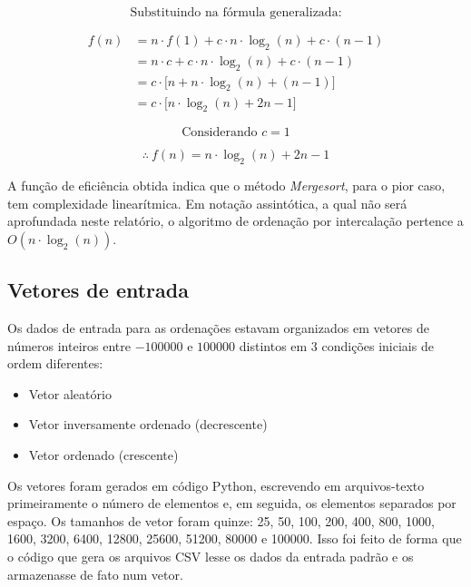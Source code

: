 \documentclass[fontsize=10pt]{article}
\begin{document}
$$ \text{Substituindo na fórmula generalizada:}$$

\begin{equation} \label{eq15}
\begin{split}
f(n) & = n \cdot f(1) + c  \cdot n \cdot \log_2(n) + c \cdot (n - 1) \\
	 & = n \cdot c + c  \cdot n \cdot \log_2(n) + c \cdot (n - 1) \\
	 & = c \cdot \Big[ n + n \cdot \log_2(n) +(n - 1) \Big] \\
	 & = c \cdot \Big[ n \cdot \log_2(n) + 2n - 1 \Big]
\end{split}
\end{equation}

$$ \text{Considerando $c = 1$}$$

\begin{equation} \label{eq16}
\therefore \ f(n) = n \cdot \log_2(n) + 2n - 1
\end{equation}

A função de eficiência obtida indica que o método \textit{Mergesort}, para o pior caso, tem complexidade linearítmica. Em notação assintótica, a qual não será aprofundada neste relatório, o algoritmo de ordenação por intercalação pertence a $O(n \cdot \log_2(n))$.

\subsection{Vetores de entrada}
Os dados de entrada para as ordenações estavam organizados em vetores de números inteiros entre $-100000$ e $100000$ distintos em 3 condições iniciais de ordem diferentes:

\begin{itemize}
\item Vetor aleatório
\item Vetor inversamente ordenado (decrescente)
\item Vetor ordenado (crescente)
\end{itemize}

Os vetores foram gerados em código Python, escrevendo em arquivos-texto primeiramente o número de elementos e, em seguida, os elementos separados por espaço. Os tamanhos de vetor foram quinze: 25, 50, 100, 200, 400, 800, 1000, 1600, 3200, 6400, 12800, 25600, 51200, 80000 e 100000. Isso foi feito de forma que o código que gera os arquivos CSV lesse os dados da entrada padrão e os armazenasse de fato num vetor.
\end{document}
